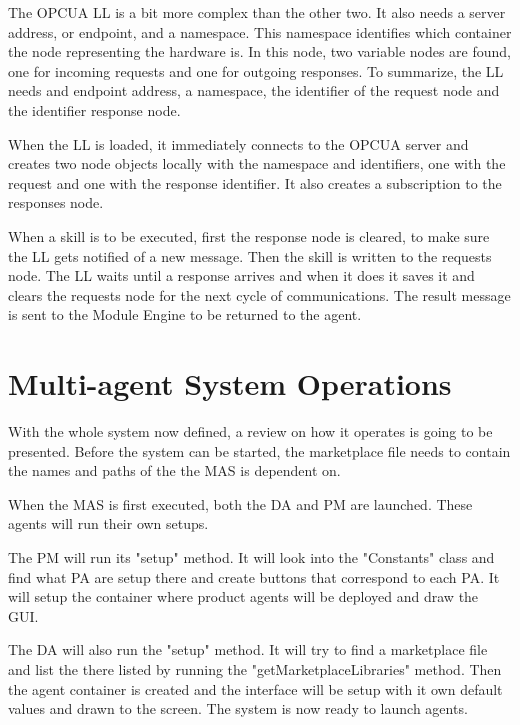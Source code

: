 The \acrshort{OPCUA} \acrshort{LL} is a bit more complex than the other two. It also needs a server address, or endpoint, and a namespace. This namespace identifies which container the node representing the hardware is. In this node, two variable nodes are found, one for incoming requests and one for outgoing responses. To summarize, the \acrshort{LL} needs and endpoint address, a namespace, the identifier of the request node and the identifier response node.

When the \acrshort{LL} is loaded, it immediately connects to the \acrshort{OPCUA} server and creates two node objects locally with the namespace and identifiers, one with the request and one with the response identifier. It also creates a subscription to the responses node.

When a skill is to be executed, first the response node is cleared, to make sure the \acrshort{LL} gets notified of a new message. Then the skill is written to the requests node. The \acrshort{LL} waits until a response arrives and when it does it saves it and clears the requests node for the next cycle of communications. The result message is sent to the Module Engine to be returned to the agent.\\


\section{Multi-agent System Operations}
\label{sec:mas_operations}

With the whole system now defined, a review on how it operates is going to be presented. Before the system can be started, the marketplace file needs to contain the names and paths of the  the \acrshort{MAS} is dependent on. 

When the \acrshort{MAS} is first executed, both the \acrlong{DA} and \acrlong{PM} are launched. These agents will run their own setups. 

The \acrshort{PM} will run its "setup" method. It will look into the "Constants" class and find what \acrlong{PA} are setup there and create buttons that correspond to each \acrshort{PA}. It will setup the container where product agents will be deployed and draw the \acrshort{GUI}.

The \acrshort{DA} will also run the "setup" method. It will try to find a marketplace file and list the  there listed by running the "getMarketplaceLibraries" method. Then the agent container is created and the interface will be setup with it own default values and drawn to the screen. The system is now ready to launch agents.

